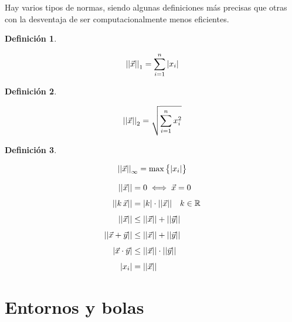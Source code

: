 \documentclass[a5paper,12pt,twoside]{book}
\newtheorem{defn}{{Definición}}[chapter]
\begin{document}
Hay varios tipos de normas, siendo algunas definiciones más precisas que otras con la desventaja de ser computacionalmente menos eficientes.

\begin{mdframed}[style=MyFrame1]
    \begin{defn}
    \end{defn}
    \begin{equation*}
        {\left|\left| {\Vec{x}} \right|\right|}_1 = \sum_{i=1}^n {\left| {x_i} \right|}
    \end{equation*}
\end{mdframed}

\begin{mdframed}[style=MyFrame1]
    \begin{defn}
        \label{defn:norm2}
    \end{defn}
    \begin{equation*}
        {\left|\left| {\Vec{x}} \right|\right|}_2 = \sqrt{\sum_{i=1}^n x_i^2}
    \end{equation*}
\end{mdframed}

\begin{mdframed}[style=MyFrame1]
    \begin{defn}
    \end{defn}
    \begin{equation*}
        {\left|\left| {\Vec{x}} \right|\right|}_\infty = \operatorname{max} \big\{ {\left| {x_i} \right|} \big\}
    \end{equation*}
\end{mdframed}



\begin{align*}
    {\left|\left| {\Vec{x}} \right|\right|} &= 0 \iff \Vec{x} = 0
    \\[1ex]
    {\left|\left| {k \, \Vec{x}} \right|\right|} &= {\left| {k} \right|} \cdot {\left|\left| {\Vec{x}} \right|\right|} \quad k\in\mathbb{R}
    \\[1ex]
    {\left|\left| {\Vec{x}} \right|\right|} &\leq {\left|\left| {\Vec{x}} \right|\right|} + {\left|\left| {\Vec{y}} \right|\right|}
    \\[1ex]
    {\left|\left| {\Vec{x}+\Vec{y}} \right|\right|} &\leq {\left|\left| {\Vec{x}} \right|\right|} + {\left|\left| {\Vec{y}} \right|\right|}
    \\[1ex]
    {\left| {\Vec{x} \cdot \Vec{y}} \right|} &\leq {\left|\left| {\Vec{x}} \right|\right|} \cdot {\left|\left| {\Vec{y}} \right|\right|}
    \\[1ex]
    {\left| {x_i} \right|} &= {\left|\left| {\Vec{x}} \right|\right|}
\end{align*}


\section{Entornos y bolas}
\end{document}
